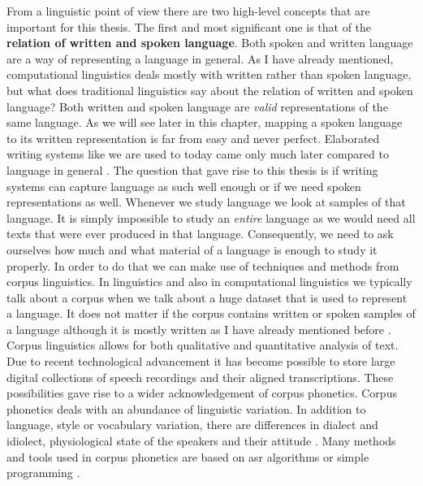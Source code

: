 \label{chap:ling-background}

From a linguistic point of view there are two high-level concepts that are important for this thesis. The first and most significant one is that of the \textbf{relation of written and spoken language}. Both spoken and written language are a way of representing a language in general. As I have already mentioned, computational linguistics deals mostly with written rather than spoken language, but what does traditional linguistics say about the relation of written and spoken language? Both written and spoken language are \textit{valid} representations of the same language. As we will see later in this chapter, mapping a spoken language to its written representation is far from easy and never perfect. Elaborated writing systems like we are used to today came only much later compared to language in general \citep{writing-systems, Hock&Joseph.2019}. The question that gave rise to this thesis is if writing systems can capture language as such well enough or if we need spoken representations as well. Whenever we study language we look at samples of that language. It is simply impossible to study an \textit{entire} language as we would need all texts that were ever produced in that language. Consequently, we need to ask ourselves how much and what material of a language is enough to study it properly. In order to do that we can make use of techniques and methods from corpus linguistics. In linguistics and also in computational linguistics we typically talk about a corpus when we talk about a huge dataset that is used to represent a language. It does not matter if the corpus contains written or spoken samples of a language although it is mostly written as I have already mentioned before \citep{McEnery&Hardie.2011}. Corpus linguistics allows for both qualitative and quantitative analysis of text. Due to recent technological advancement it has become possible to store large digital collections of speech recordings and their aligned transcriptions. These possibilities gave rise to a wider acknowledgement of corpus phonetics. Corpus phonetics deals with an abundance of linguistic variation. In addition to language, style or vocabulary variation, there are differences in dialect and idiolect, physiological state of the speakers and their attitude \citep{Liberman.2019, Chodroff.19.07.2019}. Many methods and tools used in corpus phonetics are based on \ac{asr} algorithms or simple programming \citep{Chodroff.19.07.2019}. 


